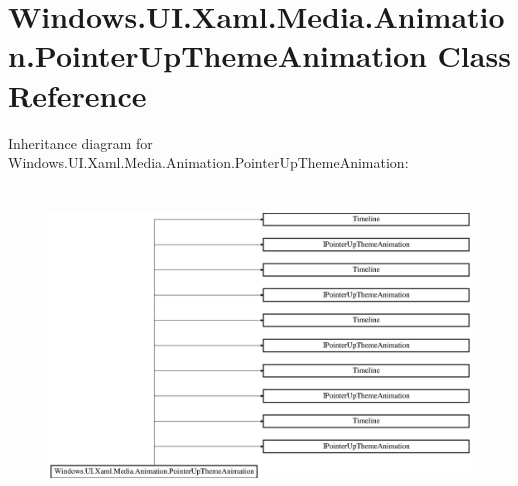\hypertarget{class_windows_1_1_u_i_1_1_xaml_1_1_media_1_1_animation_1_1_pointer_up_theme_animation}{}\section{Windows.\+U\+I.\+Xaml.\+Media.\+Animation.\+Pointer\+Up\+Theme\+Animation Class Reference}
\label{class_windows_1_1_u_i_1_1_xaml_1_1_media_1_1_animation_1_1_pointer_up_theme_animation}
Inheritance diagram for Windows.\+U\+I.\+Xaml.\+Media.\+Animation.\+Pointer\+Up\+Theme\+Animation\+:\begin{figure}[H]
\begin{center}
\leavevmode
\includegraphics[height=8.415300cm]{class_windows_1_1_u_i_1_1_xaml_1_1_media_1_1_animation_1_1_pointer_up_theme_animation}
\end{center}
\end{figure}
